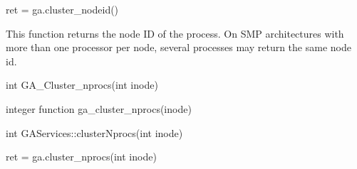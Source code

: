 \documentclass[12pt]{article}
\begin{document}
\begin{pyapi}
\begin{pycode}
ret = ga.cluster_nodeid()
\end{pycode}
\end{pyapi}

\local

\begin{desc}

This function returns the node ID of the process. On SMP architectures with
more than one processor per node, several processes may return the same node
id.

\end{desc}


\begin{capi}
\begin{ccode}
int GA_Cluster_nprocs(int inode)
\end{ccode}
\begin{funcargs}
\end{funcargs}
\end{capi}

\begin{fapi}
\begin{fcode}
integer function ga_cluster_nprocs(inode)
\end{fcode}
\begin{funcargs}
\end{funcargs}
\end{fapi}

\begin{cxxapi}
\begin{cxxcode}
int GAServices::clusterNprocs(int inode)
\end{cxxcode}
\begin{funcargs}
\end{funcargs}
\end{cxxapi}

\begin{pyapi}
\begin{pycode}
ret = ga.cluster_nprocs(int inode)
\end{pycode}
\begin{funcargs}
\end{funcargs}
\end{pyapi}

\local
\end{document}
